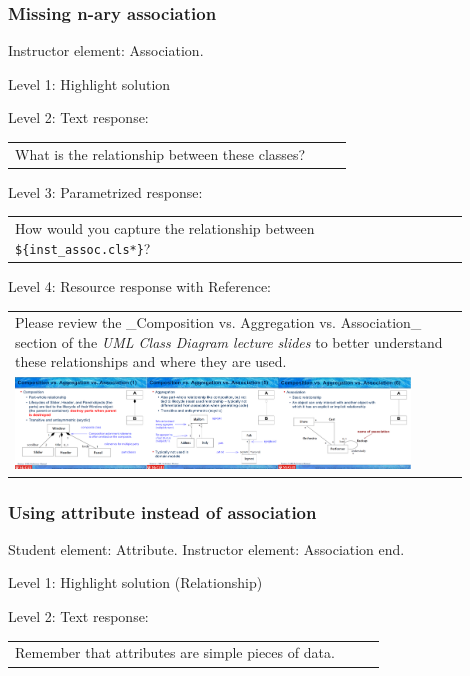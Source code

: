 \subsubsection{Missing n-ary association}

Instructor element: Association. \medskip

\noindent Level 1: Highlight solution  \medskip

\noindent Level 2: Text response: \medskip

\begin{tabular}{|p{0.9\linewidth}}
What is the relationship between these classes?
\end{tabular} \medskip

\noindent Level 3: Parametrized response: \medskip

\begin{tabular}{|p{0.9\linewidth}}
How would you capture the relationship between \verb|${inst_assoc.cls*}|?
\end{tabular} \medskip

\noindent Level 4: Resource response with Reference: \medskip

\begin{tabular}{|p{0.9\linewidth}}
Please review the _Composition vs. Aggregation vs. Association_ section of 
the \textit{UML Class Diagram lecture slides} to 
better understand these relationships and where they are used.

\\
\includegraphics[width=0.9\textwidth]{images/composition_aggregation_association.png}
\end{tabular} \medskip


\subsubsection{Using attribute instead of association}

Student element: Attribute. Instructor element: Association end. \medskip

\noindent Level 1: Highlight solution (Relationship) \medskip

\noindent Level 2: Text response: \medskip

\begin{tabular}{|p{0.9\linewidth}}
Remember that attributes are simple pieces of data.
\end{tabular} \medskip

